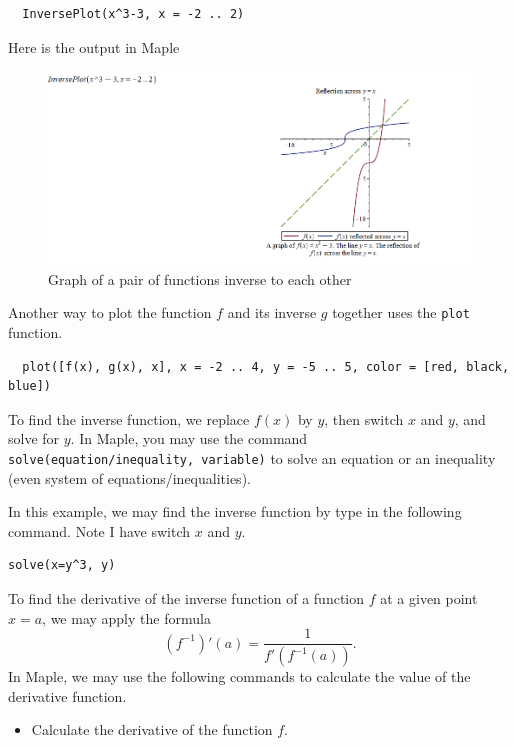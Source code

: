 \documentclass[]{book}
\providecommand{\tightlist}{%
  \setlength{\itemsep}{0pt}\setlength{\parskip}{0pt}}
\theoremstyle{definition}
\theoremstyle{definition}
\theoremstyle{definition}
\theoremstyle{remark}
\begin{document}
\begin{verbatim}
  InversePlot(x^3-3, x = -2 .. 2)
\end{verbatim}

Here is the output in Maple

\begin{figure}
\centering
\includegraphics{figs/InversePlot1.png}
\caption{Graph of a pair of functions inverse to each other}
\end{figure}

Another way to plot the function \(f\) and its inverse \(g\) together uses the \texttt{plot} function.

\begin{verbatim}
  plot([f(x), g(x), x], x = -2 .. 4, y = -5 .. 5, color = [red, black, blue])
\end{verbatim}

To find the inverse function, we replace \(f(x)\) by \(y\), then switch \(x\) and \(y\), and solve for \(y\). In Maple, you may use the command \texttt{solve(equation/inequality,\ variable)} to solve an equation or an inequality (even system of equations/inequalities).

In this example, we may find the inverse function by type in the following command. Note I have switch \(x\) and \(y\).

\begin{verbatim}
solve(x=y^3, y)
\end{verbatim}

To find the derivative of the inverse function of a function \(f\) at a given point \(x=a\), we may apply the formula
\[(f^{-1})'(a)=\dfrac{1}{f'(f^{-1}(a))}.\]
In Maple, we may use the following commands to calculate the value of the derivative function.

\begin{itemize}
\tightlist
\item
  Calculate the derivative of the function \(f\).
\end{itemize}
\end{document}
